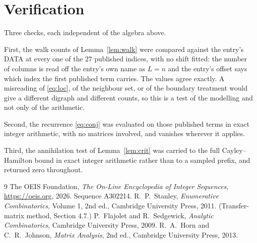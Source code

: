\documentclass[11pt,a4paper]{article}
\theoremstyle{plain}
\theoremstyle{definition}
\begin{document}
\section{Verification}

Three checks, each independent of the algebra above.

First, the walk counts of Lemma~\ref{lem:walk} were compared against the entry's DATA at
every one of the $27$ published indices, with no shift fitted: the number of columns is
read off the entry's own name as $L=n$ and the entry's offset says which index the first
published term carries. The values agree exactly. A misreading of \eqref{eq:loc}, of the
neighbour set, or of the boundary treatment would give a different digraph and different
counts, so this is a test of the modelling and not only of the arithmetic.

Second, the recurrence \eqref{eq:conj} was evaluated on those published terms in exact
integer arithmetic, with no matrices involved, and vanishes wherever it applies.

Third, the annihilation test of Lemma~\ref{lem:crit} was carried to the full
Cayley--Hamilton bound in exact integer arithmetic rather than to a sampled prefix, and
returned zero throughout.

\begin{thebibliography}{9}
 The OEIS Foundation, \emph{The On-Line Encyclopedia of Integer
Sequences}, \url{https://oeis.org}, 2026. Sequence A302214.
 R.~P.~Stanley, \emph{Enumerative Combinatorics}, Volume 1, 2nd ed.,
Cambridge University Press, 2011. (Transfer-matrix method, Section 4.7.)
 P.~Flajolet and R.~Sedgewick, \emph{Analytic Combinatorics}, Cambridge
University Press, 2009.
 R.~A.~Horn and C.~R.~Johnson, \emph{Matrix Analysis}, 2nd ed., Cambridge
University Press, 2013.
\end{thebibliography}
\end{document}
